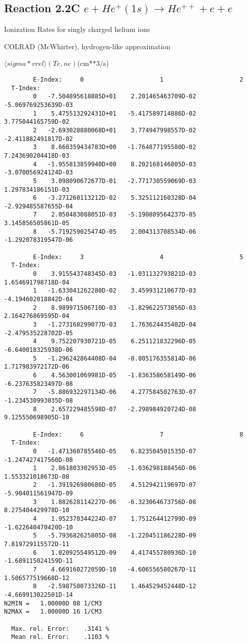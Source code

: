 \documentclass[12pt,dvipdfmx]{article}
\begin{document}
\subsection{
Reaction 2.2C $e + He^+(1s) \rightarrow He^{++}  + e  + e $
}
  Ionization Rates for singly charged helium ions

  COLRAD (McWhirter), hydrogen-like approximation \cite{kn:McWhirter}

$  \langle sigma*vrel \rangle(Te,ne) $(cm**3/s)

\begin{small}\begin{verbatim}
        E-Index:     0                     1                     2
  T-Index:
        0   -7.504895618885D+01    2.201465463709D-02   -5.069769253639D-03
        1    5.475513292431D+01   -5.417589714886D-02    3.775044165759D-02
        2   -2.693028880068D+01    3.774947998557D-02   -2.411882491817D-02
        3    8.660359434783D+00   -1.764877195580D-02    7.243690204418D-03
        4   -1.955813859940D+00    8.202168146805D-03   -3.070056924124D-03
        5    3.098090672677D-01   -2.771730559069D-03    1.297834186151D-03
        6   -3.271260113212D-02    5.325112160328D-04   -2.929485587655D-04
        7    2.050483088051D-03   -5.190809564237D-05    3.145856505861D-05
        8   -5.719259025474D-05    2.004313708534D-06   -1.292078319547D-06

        E-Index:     3                     4                     5
  T-Index:
        0    3.915543748345D-03   -1.031132793821D-03    1.654691798718D-04
        1   -1.633041262280D-02    3.459931210677D-03   -4.194602018842D-04
        2    8.989971506710D-03   -1.829622573856D-03    2.164276869595D-04
        3   -1.273168299077D-03    1.763624435402D-04   -2.479535228702D-05
        4    9.752207930721D-05    6.251121832296D-05   -6.640018325938D-06
        5   -1.296242864408D-04   -8.805176355814D-06    1.717983972172D-06
        6    4.563001069981D-05   -1.836358658149D-06   -6.237635823497D-08
        7   -5.886932297134D-06    4.277584502763D-07   -1.234530993035D-08
        8    2.657229485598D-07   -2.298984920724D-08    9.125550698905D-10

        E-Index:     6                     7                     8
  T-Index:
        0   -1.471360785546D-05    6.823504501535D-07   -1.247427417560D-08
        1    2.861803302953D-05   -1.036298188456D-06    1.553321018673D-08
        2   -1.391926980686D-05    4.512942119697D-07   -5.904011561947D-09
        3    1.882628114227D-06   -6.323064673756D-08    8.275404429978D-10
        4    1.952370344224D-07    1.751264412799D-09   -1.622640470420D-10
        5   -5.793682625805D-08   -1.220451186228D-09    7.819729115572D-11
        6    1.020925549512D-09    4.417455780936D-10   -1.689115024159D-11
        7    4.669160272059D-10   -4.606556580267D-11    1.506577519668D-12
        8   -2.598750073326D-11    1.464529452448D-12   -4.669913022501D-14
N2MIN =   1.00000D 08 1/CM3
N2MAX =   1.00000D 16 1/CM3

  Max. rel. Error:    .3141 %
  Mean rel. Error:    .1103 %

\end{verbatim}\end{small}
\end{document}
